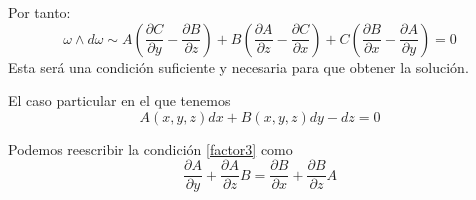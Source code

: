 \documentclass[openany]{book}
\begin{document}
Por tanto:
\begin{equation}
  \omega \wedge d\omega \sim A \left( \dfrac{\partial C}{\partial y} - \dfrac{\partial B}{\partial z} \right) + B \left( \dfrac{\partial A}{\partial z}- \dfrac{\partial C}{\partial x} \right) +C \left( \dfrac{\partial B}{\partial x} - \dfrac{\partial A}{\partial y} \right) = 0 
  \label{factor3}
\end{equation}
Esta será una condición suficiente y necesaria para que obtener la solución.

El caso particular en el que tenemos
$$ A(x,y,z)dx+B(x,y,z)dy -dz = 0 $$

Podemos reescribir la condición \ref{factor3} como
$$ \dfrac{\partial A}{\partial y}+ \dfrac{\partial A}{\partial z}B = \dfrac{\partial B}{\partial x} + \dfrac{\partial B}{\partial z}A $$ 
\end{document}
